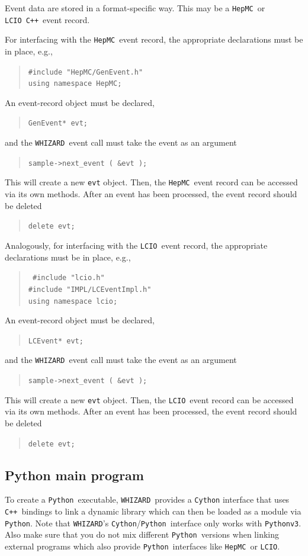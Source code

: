 \documentclass[12pt]{book}
\newcommand{\ttt}[1]{\texttt{#1}}
\newcommand{\whizard}{\ttt{WHIZARD}}
\newcommand{\lcio}{\ttt{LCIO}}
\newcommand{\hepmc}{\ttt{HepMC}}
\newcommand{\cpp}{\ttt{C++}}
\newcommand{\python}{\ttt{Python}}
\begin{document}
Event data are stored in a format-specific way.  This may be a \hepmc\ or
\lcio\ \cpp\ event record.

For interfacing with the \hepmc\ event record, the appropriate declarations
must be in place, e.g.,
\begin{quote}
  \tt \#include "HepMC/GenEvent.h"
  \\
  using namespace HepMC;
\end{quote}
An event-record object must be declared,
\begin{quote}
  \tt GenEvent* evt;
\end{quote}
and the \whizard\ event call must take the event as an argument
\begin{quote}
  \tt sample->next\_event ( \&evt );
\end{quote}
This will create a new \ttt{evt} object.
Then, the \hepmc\ event record can be accessed via its own methods.  After
an event has been processed, the event record should be deleted
\begin{quote}
  \tt delete evt;
\end{quote}

Analogously, for interfacing with the \lcio\ event record, the appropriate declarations
must be in place, e.g.,
\begin{quote}
  \tt
  \#include "lcio.h"
  \\
  \#include "IMPL/LCEventImpl.h"
  \\
  using namespace lcio;
\end{quote}
An event-record object must be declared,
\begin{quote}
  \tt LCEvent* evt;
\end{quote}
and the \whizard\ event call must take the event as an argument
\begin{quote}
  \tt sample->next\_event ( \&evt );
\end{quote}
This will create a new \ttt{evt} object.
Then, the \lcio\ event record can be accessed via its own methods.  After
an event has been processed, the event record should be deleted
\begin{quote}
  \tt delete evt;
\end{quote}


\subsection{Python main program}
To create a \python\ executable, \whizard\ provides a \ttt{Cython}
interface that uses \cpp\ bindings to link a dynamic library which can
then be loaded as a module via \python. Note that \whizard's
\ttt{Cython}/\python\ interface only works with \python\ttt{v3}. Also
make sure that you do not mix different \python\ versions when linking
external programs which also provide \python\ interfaces like
\hepmc\ or \lcio.
\end{document}
